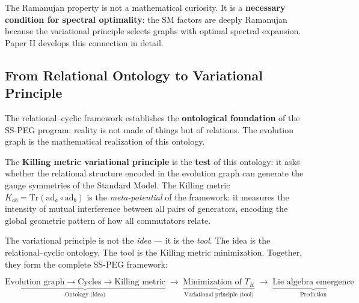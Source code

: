 The Ramanujan property is not a mathematical curiosity. It is a \textbf{necessary condition for spectral optimality}: the SM factors are deeply Ramanujan because the variational principle selects graphs with optimal spectral expansion. Paper II develops this connection in detail.

\subsection{From Relational Ontology to Variational Principle}\label{sec:bridge_to_variational}

The relational--cyclic framework establishes the \textbf{ontological foundation} of the SS-PEG program: reality is not made of things but of relations. The evolution graph is the mathematical realization of this ontology.

The \textbf{Killing metric variational principle} is the \textbf{test} of this ontology: it asks whether the relational structure encoded in the evolution graph can generate the gauge symmetries of the Standard Model. The Killing metric $K_{ab} = \mathrm{Tr}(\mathrm{ad}_a \circ \mathrm{ad}_b)$ is the \textit{meta-potential} of the framework: it measures the intensity of mutual interference between all pairs of generators, encoding the global geometric pattern of how all commutators relate.

The variational principle is not the \textit{idea} --- it is the \textit{tool}. The idea is the relational--cyclic ontology. The tool is the Killing metric minimization. Together, they form the complete SS-PEG framework:

\begin{equation}
\underbrace{\text{Evolution graph} \to \text{Cycles} \to \text{Killing metric}}_{\text{Ontology (idea)}} \;\to\; \underbrace{\text{Minimization of } T_K}_{\text{Variational principle (tool)}} \;\to\; \underbrace{\text{Lie algebra emergence}}_{\text{Prediction}}
\end{equation}
